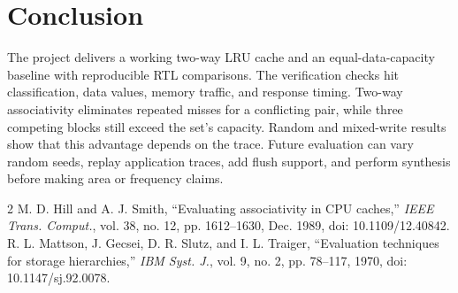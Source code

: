 \documentclass[conference]{IEEEtran}
\begin{document}
\section{Conclusion}
The project delivers a working two-way LRU cache and an equal-data-capacity
baseline with reproducible RTL comparisons. The verification checks hit
classification, data values, memory traffic, and response timing.
Two-way associativity eliminates repeated misses for a conflicting pair,
while three competing blocks still exceed the set's capacity. Random and
mixed-write results show that this advantage depends on the trace.
Future evaluation can vary random seeds, replay application traces, add
flush support, and perform synthesis before making area or frequency claims.

\begin{thebibliography}{2}
M. D. Hill and A. J. Smith, \textquotedblleft Evaluating associativity in CPU
caches,\textquotedblright{} \emph{IEEE Trans. Comput.}, vol. 38, no. 12,
pp. 1612--1630, Dec. 1989, doi: 10.1109/12.40842.
R. L. Mattson, J. Gecsei, D. R. Slutz, and I. L. Traiger,
\textquotedblleft Evaluation techniques for storage hierarchies,\textquotedblright{}
\emph{IBM Syst. J.}, vol. 9, no. 2, pp. 78--117, 1970,
doi: 10.1147/sj.92.0078.
\end{thebibliography}
\end{document}
